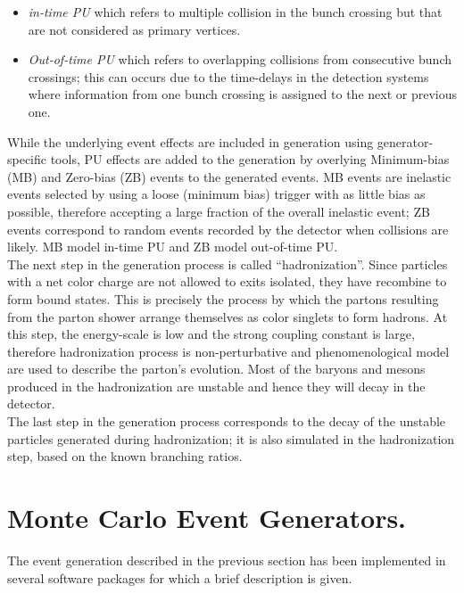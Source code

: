 \begin{itemize}
\item \textit{in-time PU} which refers to multiple \pp collision in the bunch crossing but that are not considered as primary vertices. 
\item \textit{Out-of-time PU} which refers to overlapping \pp collisions from consecutive bunch crossings; this can occurs due to the time-delays in the detection systems where information from one bunch crossing is assigned to the next or previous one. 
\end{itemize}

\noindent While the underlying event effects are included in generation using generator-specific tools, PU effects are added to the generation by overlying Minimum-bias (MB) and Zero-bias (ZB) events to the generated events. MB events are inelastic events selected by using a loose (minimum bias) trigger with as little bias as possible, therefore accepting a large fraction of the overall inelastic event; ZB events correspond to random events recorded by the detector when collisions are likely. MB model in-time PU and ZB model out-of-time PU.\\ 

\noindent The next step in the generation process is called ``hadronization''. Since particles with a net color charge are not allowed to exits isolated, they have recombine to form bound states. This is precisely the process by which the partons resulting from the parton shower arrange themselves as color singlets to form hadrons. At this step, the energy-scale is low and the strong coupling constant is large, therefore hadronization process is non-perturbative and phenomenological model are used to describe the parton's evolution. Most of the baryons and mesons produced in the hadronization are unstable and hence they will decay in the detector.\\

\noindent The last step in the generation process corresponds to the decay of the unstable particles generated during hadronization; it is also simulated in the hadronization step, based on the known branching ratios. 

\section{Monte Carlo Event Generators.}

\noindent The event generation described in the previous section has been implemented in several software packages for which a brief description is given.     


